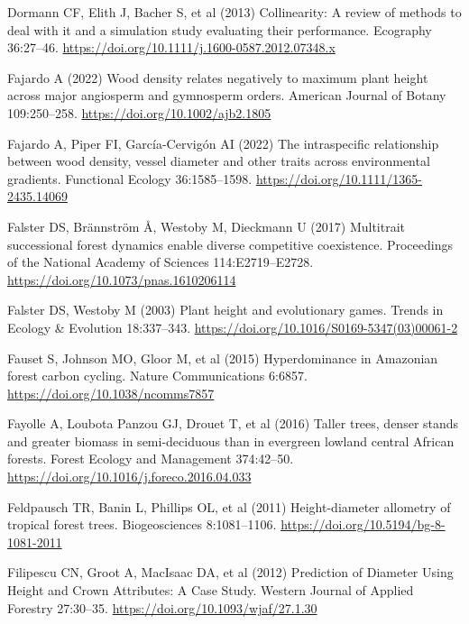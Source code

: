 \documentclass[
  12pt,
  letterpaper,
  DIV=11,
  numbers=noendperiod]{scrartcl}
\newlength{\cslhangindent}
\newlength{\cslentryspacingunit} %
\newenvironment{CSLReferences}[2] %
 {%
  \setlength{\parindent}{0pt}
  \ifodd #1
  \let\oldpar\par
  \def\par{\hangindent=\cslhangindent\oldpar}
  \fi
  \setlength{\parskip}{#2\cslentryspacingunit}
 }%
 {}
\begin{document}
\begin{CSLReferences}{1}{0}
\leavevmode{}%
Dormann CF, Elith J, Bacher S, et al (2013) Collinearity: A review of
methods to deal with it and a simulation study evaluating their
performance. Ecography 36:27--46.
\url{https://doi.org/10.1111/j.1600-0587.2012.07348.x}

\leavevmode{}%
Fajardo A (2022) Wood density relates negatively to maximum plant height
across major angiosperm and gymnosperm orders. American Journal of
Botany 109:250--258. \url{https://doi.org/10.1002/ajb2.1805}

\leavevmode{}%
Fajardo A, Piper FI, García-Cervigón AI (2022) The intraspecific
relationship between wood density, vessel diameter and other traits
across environmental gradients. Functional Ecology 36:1585--1598.
\url{https://doi.org/10.1111/1365-2435.14069}

\leavevmode{}%
Falster DS, Brännström Å, Westoby M, Dieckmann U (2017) Multitrait
successional forest dynamics enable diverse competitive coexistence.
Proceedings of the National Academy of Sciences 114:E2719--E2728.
\url{https://doi.org/10.1073/pnas.1610206114}

\leavevmode{}%
Falster DS, Westoby M (2003) Plant height and evolutionary games. Trends
in Ecology \& Evolution 18:337--343.
\url{https://doi.org/10.1016/S0169-5347(03)00061-2}

\leavevmode{}%
Fauset S, Johnson MO, Gloor M, et al (2015) Hyperdominance in
{Amazonian} forest carbon cycling. Nature Communications 6:6857.
\url{https://doi.org/10.1038/ncomms7857}

\leavevmode{}%
Fayolle A, Loubota Panzou GJ, Drouet T, et al (2016) Taller trees,
denser stands and greater biomass in semi-deciduous than in evergreen
lowland central {African} forests. Forest Ecology and Management
374:42--50. \url{https://doi.org/10.1016/j.foreco.2016.04.033}

\leavevmode{}%
Feldpausch TR, Banin L, Phillips OL, et al (2011) Height-diameter
allometry of tropical forest trees. Biogeosciences 8:1081--1106.
\url{https://doi.org/10.5194/bg-8-1081-2011}

\leavevmode{}%
Filipescu CN, Groot A, MacIsaac DA, et al (2012) Prediction of
{Diameter} {Using} {Height} and {Crown} {Attributes}: {A} {Case}
{Study}. Western Journal of Applied Forestry 27:30--35.
\url{https://doi.org/10.1093/wjaf/27.1.30}


\end{CSLReferences}
\end{document}
